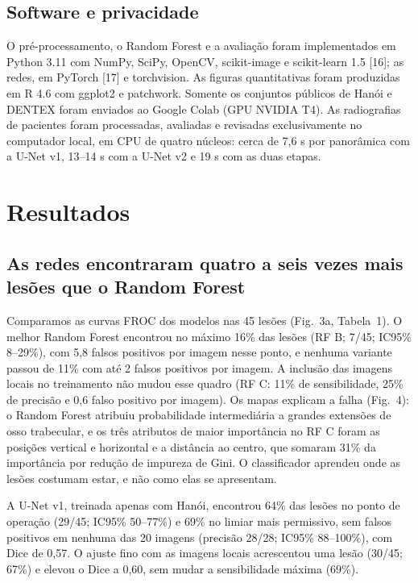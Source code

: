 \documentclass[twocolumn]{article}
\begin{document}
\subsection{Software e privacidade}

O pré-processamento, o Random Forest e a avaliação foram implementados em Python 3.11 com NumPy, SciPy, OpenCV, scikit-image e scikit-learn 1.5 [16]; as redes, em PyTorch [17] e torchvision. As figuras quantitativas foram produzidas em R 4.6 com ggplot2 e patchwork. Somente os conjuntos públicos de Hanói e DENTEX foram enviados ao Google Colab (GPU NVIDIA T4). As radiografias de pacientes foram processadas, avaliadas e revisadas exclusivamente no computador local, em CPU de quatro núcleos: cerca de 7,6 s por panorâmica com a U-Net v1, 13--14 s com a U-Net v2 e 19 s com as duas etapas.

\section{Resultados}

\subsection{As redes encontraram quatro a seis vezes mais lesões que o Random Forest}

Comparamos as curvas FROC dos modelos nas 45 lesões (Fig.~3a, Tabela~1). O melhor Random Forest encontrou no máximo 16\% das lesões (RF B; 7/45; IC95\% 8--29\%), com 5,8 falsos positivos por imagem nesse ponto, e nenhuma variante passou de 11\% com até 2 falsos positivos por imagem. A inclusão das imagens locais no treinamento não mudou esse quadro (RF C: 11\% de sensibilidade, 25\% de precisão e 0,6 falso positivo por imagem). Os mapas explicam a falha (Fig.~4): o Random Forest atribuiu probabilidade intermediária a grandes extensões de osso trabecular, e os três atributos de maior importância no RF C foram as posições vertical e horizontal e a distância ao centro, que somaram 31\% da importância por redução de impureza de Gini. O classificador aprendeu onde as lesões costumam estar, e não como elas se apresentam.

A U-Net v1, treinada apenas com Hanói, encontrou 64\% das lesões no ponto de operação (29/45; IC95\% 50--77\%) e 69\% no limiar mais permissivo, sem falsos positivos em nenhuma das 20 imagens (precisão 28/28; IC95\% 88--100\%), com Dice de 0,57. O ajuste fino com as imagens locais acrescentou uma lesão (30/45; 67\%) e elevou o Dice a 0,60, sem mudar a sensibilidade máxima (69\%).
\end{document}
